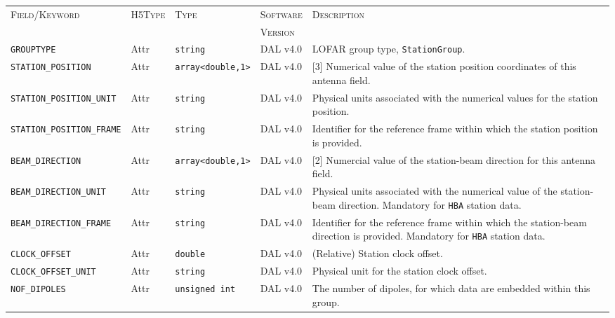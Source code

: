 \documentclass[a4paper,10pt,bibtotoc]{scrartcl}
\begin{document}
\begin{table}[htbp]
  \centering
  \begin{tabular}{|llllp{4.5cm}|}
    \hline
    \textsc{Field/Keyword} & \textsc{H5Type} & \textsc{Type} & \textsc{Software} & \textsc{Description} \\
                           &                 &               & \textsc{Version}  &                      \\
    \hline
    \hline
    \small {\texttt{GROUPTYPE}} & Attr & \verb|string| & DAL v4.0 & LOFAR group type, \texttt{StationGroup}. \\
    \small {\texttt{STATION\_POSITION}} & Attr & \verb|array<double,1>| & DAL v4.0 & [3] Numerical value of the station position coordinates of this antenna field. \\
    \small {\texttt{STATION\_POSITION\_UNIT}}  & Attr & \verb|string| & DAL v4.0 & Physical units associated with the numerical values for the station position. \\
    \small {\texttt{STATION\_POSITION\_FRAME}} & Attr & \verb|string| & DAL v4.0 & Identifier for the reference frame within which the station position is provided. \\
    \small {\texttt{BEAM\_DIRECTION}} & Attr & \verb|array<double,1>| & DAL v4.0 & [2] Numercial value of the station-beam direction for this antenna field. \\
    \small {\texttt{BEAM\_DIRECTION\_UNIT}}  & Attr & \verb|string| & DAL v4.0 & Physical units associated with the numerical value of the station-beam direction. Mandatory for \verb|HBA| station data.\\
    \small {\texttt{BEAM\_DIRECTION\_FRAME}} & Attr & \verb|string| & DAL v4.0 & Identifier for the reference frame within which the station-beam direction is provided. Mandatory for \verb|HBA| station data.\\
    \small {\texttt{CLOCK\_OFFSET}} & Attr & \verb|double| & DAL v4.0 & (Relative) Station clock offset. \\
    \small {\texttt{CLOCK\_OFFSET\_UNIT}} & Attr & \verb|string| & DAL v4.0 & Physical unit for the station clock offset. \\
    \small {\texttt{NOF\_DIPOLES}} & Attr & \verb|unsigned int| & DAL v4.0 & The number of dipoles, for which data are embedded within this group. \\

\end{tabular}
\end{table}
\end{document}
